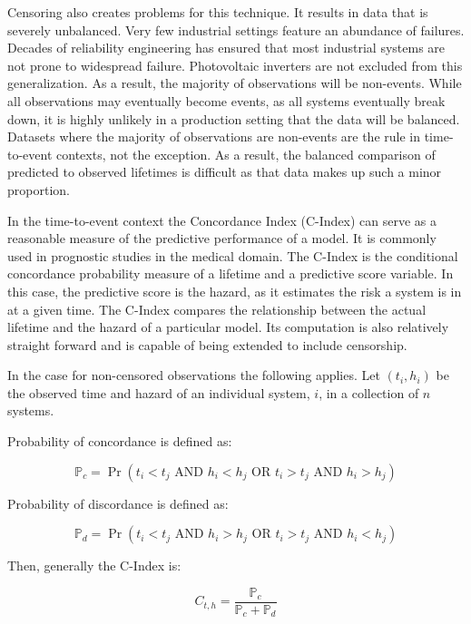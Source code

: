 
Censoring also creates problems for this technique. It results in data that is severely unbalanced. Very few industrial settings feature an abundance of failures. Decades of reliability engineering has ensured that most industrial systems are not prone to widespread failure. Photovoltaic inverters are not excluded from this generalization\cite{Petrone2008}. As a result, the majority of observations will be non-events. While all observations may eventually become events, as all systems eventually break down, it is highly unlikely in a production setting that the data will be balanced. Datasets where the majority of observations are non-events are the rule in time-to-event contexts, not the exception. As a result, the balanced comparison of predicted to observed lifetimes is difficult as that data makes up such a minor proportion. 

In the time-to-event context the Concordance Index (C-Index) can serve as a reasonable measure of the predictive performance of a model. It is commonly used in prognostic studies in the medical domain\cite{Tripepi2010}. The C-Index is the conditional concordance probability measure of a lifetime and a predictive score variable\cite{Kang2015}. In this case, the predictive score is the hazard, as it estimates the risk a system is in at a given time. The C-Index compares the relationship between the actual lifetime and the hazard of a particular model. Its computation is also relatively straight forward and is capable of being extended to include censorship.

In the case for non-censored observations the following applies. Let $(t_i, h_i)$ be the observed time and hazard of an individual system, $i$, in a collection of $n$ systems.

Probability of concordance is defined as:

$$\mathbb{P}_c  = \Pr(t_i  < t_j \text{ AND } h_i < h_j \text{ OR } t_i  > t_j \text{ AND } h_i > h_j)  $$

Probability of discordance is defined as:

$$\mathbb{P}_d  = \Pr(t_i  < t_j \text{ AND } h_i > h_j \text{ OR } t_i  > t_j \text{ AND } h_i < h_j)  $$

Then, generally the C-Index is:

$$ C_{t, h} = \frac{\mathbb{P}_c}{\mathbb{P}_c + \mathbb{P}_d} $$

